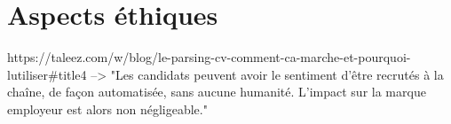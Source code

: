 \section{Aspects éthiques}\label{section:aspects_ethiques}




https://taleez.com/w/blog/le-parsing-cv-comment-ca-marche-et-pourquoi-lutiliser#title4
--> "Les candidats peuvent avoir le sentiment d’être recrutés à la chaîne, de façon automatisée, sans aucune humanité. L’impact sur la marque employeur est alors non négligeable."
